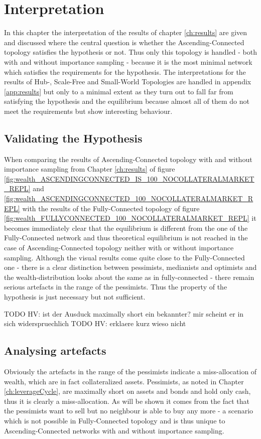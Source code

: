 \documentclass[Bachelorarbeit.tex]{subfiles}
\begin{document}
\graphicspath{{./figures/interpretation/}}	%

\chapter{Interpretation}
\label{ch:interpretation}

In this chapter the interpretation of the results of chapter \ref{ch:results} are given and discussed where the central question is whether the Ascending-Connected topology satisfies the hypothesis or not. Thus only this topology is handled - both with and without importance sampling - because it is the most minimal network which satisfies the requirements for the hypothesis. The interpretations for the results of Hub-, Scale-Free and Small-World Topologies are handled in appendix \ref{app:results} but only to a minimal extent as they turn out to fall far from satisfying the hypothesis and the equilibrium because almost all of them do not meet the requirements but show interesting behaviour.

\section{Validating the Hypothesis}
When comparing the results of Ascending-Connected topology with and without importance sampling from Chapter \ref{ch:results} of figure \ref{fig:wealth_ASCENDINGCONNECTED_IS_100_NOCOLLATERALMARKET_REPL} and \ref{fig:wealth_ASCENDINGCONNECTED_100_NOCOLLATERALMARKET_REPL} with the results of the Fully-Connected topology of figure \ref{fig:wealth_FULLYCONNECTED_100_NOCOLLATERALMARKET_REPL} it becomes immediately clear that the equilibrium is different from the one of the Fully-Connected network and thus theoretical equilibrium is not reached in the case of Ascending-Connected topology neither with or without importance sampling. Although the visual results come quite close to the Fully-Connected one - there is a clear distinction between pessimists, medianists and optimists and the wealth-distribution looks about the same as in fully-connected - there remain serious artefacts in the range of the pessimists. Thus the property of the hypothesis is just necessary but not sufficient.

TODO HV: ist der Ausduck maximally short ein bekannter? mir scheint er in sich widerspruechlich
TODO HV: erklaere kurz wieso nicht

\section{Analysing artefacts}
Obviously the artefacts in the range of the pessimists indicate a miss-allocation of wealth, which are in fact collateralized assets. Pessimists, as noted in Chapter \ref{ch:leverageCycle}, are maximally short on assets and bonds and hold only cash, thus it is clearly a miss-allocation. As will be shown it comes from the fact that the pessimists want to sell but no neighbour is able to buy any more - a scenario which is not possible in Fully-Connected topology and is thus unique to Ascending-Connected networks with and without importance sampling.
\end{document}
